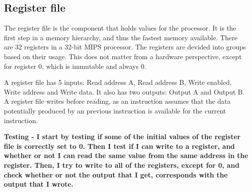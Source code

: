 \subsection{Register file}
The register file is the component that holds values for the processor. It is
the first step in a memory hierarchy, and thus the fastest memory available.
There are 32 registers in a 32-bit MIPS processor. The registers are devided
into groups based on their usage. This does not matter from a hardware
perspective, except for register 0, which is immutable and always 0.

A register file has 5 inputs: Read address A, Read address B, Write enabled,
Write address and Write data. It also has two outputs: Output A and Output B. A
register file writes before reading, as an instruction assumes that the data
potentially produced by an previous instruction is available for the current
instruction.

\bf{Testing} - I start by testing if some of the initial values of the register
file is correctly set to 0. Then I test if I can write to a register, and
whether or not I can read the same value from the same address in the register.
Then, I try to write to all of the registers, except for 0, and check whether
or not the output that I get, corresponds with the output that I wrote.
